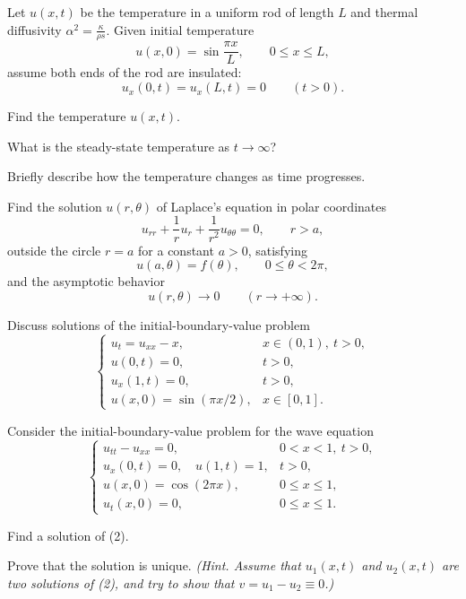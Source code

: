 \documentclass[11pt,oneside]{article}
\begin{document}
\begin{problem}
Let $u(x,t)$ be the temperature in a uniform rod of length $L$ and thermal diffusivity $\alpha^2=\frac{\kappa}{\rho s}$. Given initial temperature
\[
u(x,0)=\sin\frac{\pi x}{L},\qquad 0\le x\le L,
\]
assume both ends of the rod are insulated:
\[
u_x(0,t)=u_x(L,t)=0\qquad(t>0).
\]
\begin{problemsubparts}
\item Find the temperature $u(x,t)$.
\item What is the steady-state temperature as $t\to\infty$?
\item Briefly describe how the temperature changes as time progresses.
\end{problemsubparts}
\end{problem}

\begin{problem}
Find the solution $u(r,\theta)$ of Laplace's equation in polar coordinates
\[
u_{rr}+\frac1r u_r+\frac1{r^2}u_{\theta\theta}=0,\qquad r>a,
\]
outside the circle $r=a$ for a constant $a>0$, satisfying
\[
u(a,\theta)=f(\theta),\qquad 0\le\theta<2\pi,
\]
and the asymptotic behavior
\[
u(r,\theta)\to0\qquad(r\to+\infty).
\]
\end{problem}

\begin{problem}
Discuss solutions of the initial-boundary-value problem
\[
\begin{cases}
u_t=u_{xx}-x,&x\in(0,1),\ t>0,\\
u(0,t)=0,&t>0,\\
u_x(1,t)=0,&t>0,\\
u(x,0)=\sin(\pi x/2),&x\in[0,1].
\end{cases}
\]
\end{problem}

\begin{problem}
Consider the initial-boundary-value problem for the wave equation
\[
\begin{cases}
u_{tt}-u_{xx}=0,&0<x<1,\ t>0,\\
u_x(0,t)=0,\quad u(1,t)=1,&t>0,\\
u(x,0)=\cos(2\pi x),&0\le x\le1,\\
u_t(x,0)=0,&0\le x\le1.
\end{cases}\tag{2}
\]
\begin{problemsubparts}
\item Find a solution of (2).
\item Prove that the solution is unique. \textit{(Hint. Assume that $u_1(x,t)$ and $u_2(x,t)$ are two solutions of (2), and try to show that $v=u_1-u_2\equiv0$.)}
\end{problemsubparts}
\end{problem}
\end{document}
